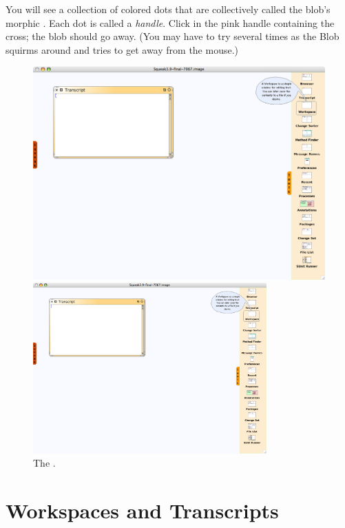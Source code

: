 \documentclass[a4paper,10pt,twoside]{book}
\begin{document}
You will see a collection of colored dots that are collectively called the blob's morphic .
Each dot is called a \emph{handle}.
Click in the pink handle containing the cross; the blob should go away. 
(You may have to try several times as the Blob squirms around and tries to get away from the mouse.)

\begin{figure}[htb]
\ifluluelse
	{\centerline {\includegraphics[width=\textwidth]{Tools}}}
	{\centerline {\includegraphics[width=0.8\textwidth]{Tools}}}
\caption{The \sq \toolsflap.\label{fig:tools}}
\end{figure}

\section{Workspaces and Transcripts}
\label{sec:transcript}
\end{document}
